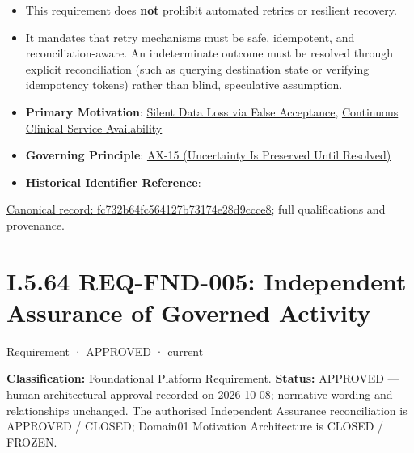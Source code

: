 \begin{itemize}


\item This requirement does \textbf{not} prohibit automated retries or resilient recovery.

\item 

It mandates that retry mechanisms must be safe, idempotent, and reconciliation-aware. An indeterminate outcome must be resolved through explicit reconciliation (such as querying destination state or verifying idempotency tokens) rather than blind, speculative assumption.




\item 

\textbf{Primary Motivation}: \href{\detokenize{../../../../../../../../docs/markdown/01-motivation/drivers-assessments/assessments.md}}{Silent Data Loss via False Acceptance}, \href{\detokenize{../../../../../../../../docs/markdown/01-motivation/drivers-assessments/drivers.md}}{Continuous Clinical Service Availability}




\item \textbf{Governing Principle}: \hyperref[element:ef8abbaec37e4890ad78b9f263e67906]{AX-15 (Uncertainty Is Preserved Until Resolved)}

\item \textbf{Historical Identifier Reference}: \texttt{}

\end{itemize}

{\footnotesize \href{../../../../../../../continuum/motivation/requirement/fc732b64fc564127b73174e28d9ccce8.md}{Canonical record: fc732b64fc564127b73174e28d9ccce8}; full qualifications and provenance.}\par
\section*{I.5.64 REQ-FND-005: Independent Assurance of Governed Activity}
\label{navigation:I.5.64}

\label{element:bbb7438e78604308abba93afc14f4e2e}
{\small Requirement · APPROVED · current}\par

\textbf{Classification:} Foundational Platform Requirement. \textbf{Status:} APPROVED — human architectural approval recorded on 2026-10-08; normative wording and relationships unchanged. The authorised Independent Assurance reconciliation is APPROVED / CLOSED; Domain01 Motivation Architecture is CLOSED / FROZEN.



